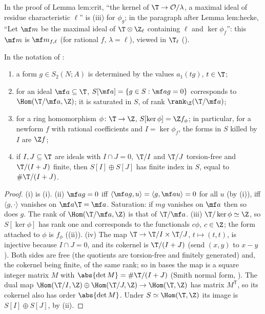 \begin{paperlink}\label{pl:hecke:max-ideal}
In the proof of Lemma lem:crit, ``the kernel of $\T\to\mathcal O/\lambda$, a maximal ideal of residue characteristic $\ell$'' is (iii) for $\phi_g$; in the paragraph after Lemma lem:hecke,
``Let $\mf m$ be the maximal ideal of $\T\otimes\Z_\ell$ containing $\ell$ and $\ker\phi_f$'': this $\mf m$ is $\mf m_{f,\ell}$ (for rational $f$, $\lambda=\ell$), viewed in $\T_\ell$ ().
\end{paperlink}

\begin{corollary}\label{cor:hecke:pairing-consequences}
In the notation of :
\begin{enumerate}[label=(\roman*)]
\item a form $g\in S_2(N;A)$ is determined by the values $a_1(tg)$, $t\in\T$;
\item for an ideal $\mf a\subseteq\T$, $S[\mf a]=\{g\in S:\mf ag=0\}$ corresponds to $\Hom(\T/\mf a,\Z)$; it is saturated in $S$, of rank $\rank_\Z(\T/\mf a)$;
\item for a ring homomorphism $\phi\colon\T\to\Z$, $S[\ker\phi]=\Z f_\phi$; in particular, for a newform $f$ with rational coefficients and $I=\ker\phi_f$, the forms in $S$ killed by $I$ are
$\Z f$;
\item if $I,J\subseteq\T$ are ideals with $I\cap J=0$, $\T/I$ and $\T/J$ torsion-free and $\T/(I+J)$ finite, then $S[I]\oplus S[J]$ has finite index in $S$, equal to $\#\T/(I+J)$.
\end{enumerate}
\end{corollary}

\begin{proof}
(i) is (i). (ii) $\mf ag=0$ iff $\langle\mf ag,u\rangle=\langle g,\mf au\rangle=0$ for all $u$ (by (i)), iff $\langle g,\cdot\rangle$ vanishes on $\mf a\T=\mf a$. Saturation: if
$mg$ vanishes on $\mf a$ then so does $g$. The rank of $\Hom(\T/\mf a,\Z)$ is that of $\T/\mf a$. (iii) $\T/\ker\phi\simeq\Z$, so $S[\ker\phi]$ has rank one and corresponds to the functionals
$c\phi$, $c\in\Z$; the form attached to $\phi$ is $f_\phi$ ((ii)). (iv) The map $\T\to\T/I\times\T/J$, $t\mapsto(t,t)$, is injective because $I\cap J=0$,
and its cokernel is $\T/(I+J)$ (send $(x,y)$ to $x-y$). Both sides are free (the quotients are torsion-free and finitely generated) and, the cokernel being finite, of the same
rank; so in bases the map is a square integer matrix $M$ with $\abs{\det M}=\#\T/(I+J)$ (Smith normal form, ). The dual map $\Hom(\T/I,\Z)\oplus\Hom(\T/J,\Z)\to\Hom(\T,\Z)$
has matrix $M^{\mathsf T}$, so its cokernel also has order $\abs{\det M}$. Under $S\simeq\Hom(\T,\Z)$ its image is $S[I]\oplus S[J]$, by (ii).
\end{proof}

